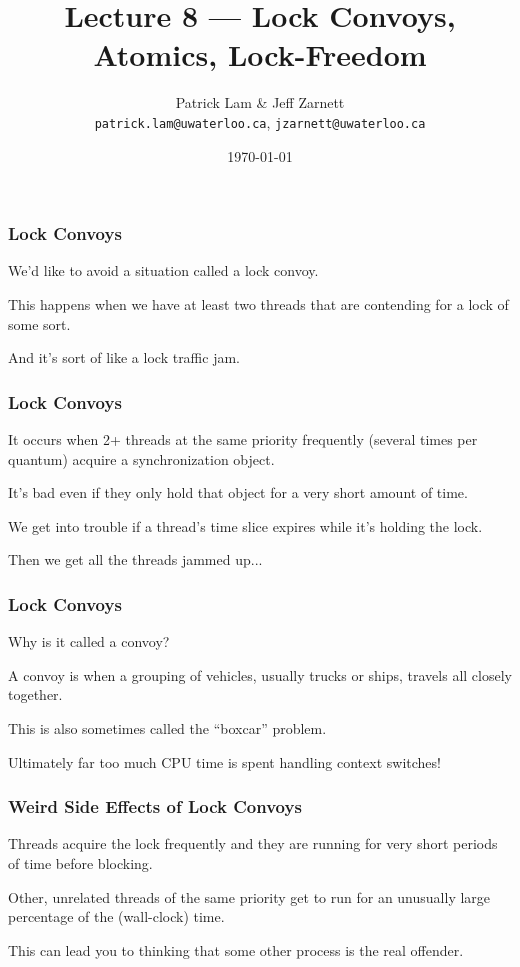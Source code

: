 

\title{Lecture 8 --- Lock Convoys, Atomics, Lock-Freedom}

\author{Patrick Lam \& Jeff Zarnett \\ \small \texttt{patrick.lam@uwaterloo.ca}, \texttt{jzarnett@uwaterloo.ca}}
\date{\today}




\begin{frame}
  \titlepage

 \end{frame}
 

\begin{frame}
\frametitle{Lock Convoys}
We'd like to avoid a situation called a \alert{lock convoy}. 

This happens when we have at least two threads that are contending for a lock of some sort. 

And it's sort of like a lock traffic jam.

\end{frame}


\begin{frame}
\frametitle{Lock Convoys}

It occurs when 2+ threads at the same priority frequently (several times per quantum) acquire a synchronization object. 

It's bad even if they only hold that object for a very short amount of time. 

We get into trouble if a thread's time slice expires while it's holding the lock.

Then we get all the threads jammed up...

\end{frame}

\begin{frame}
\frametitle{Lock Convoys}
Why is it called a convoy? 

A convoy is when a grouping of vehicles, usually trucks or ships, travels all closely together.

This is also sometimes called the ``boxcar'' problem.

Ultimately far too much CPU time is spent handling context switches!

\end{frame}


\begin{frame}
\frametitle{Weird Side Effects of Lock Convoys}

Threads acquire the lock frequently and they are running for very short periods of time before blocking. 

Other, unrelated threads of the same priority get to run for an unusually large percentage of the (wall-clock) time. 

This can lead you to thinking that some other process is the real offender.

\end{frame}

